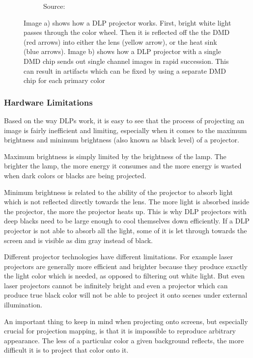 \begin{figure}[ht]
\begin{subfigure}[b]{0.49\textwidth}
        \caption{Source: \citet{ImageProjectorDLPRainbow}}
    \end{subfigure}
    \caption{Image a) shows how a DLP projector works. First, bright white light passes through the color wheel. Then it is reflected off the the DMD (red arrows) into either the lens (yellow arrow), or the heat sink (blue arrows). Image b) shows how a DLP projector with a single DMD chip sends out single channel images in rapid succession. This can result in artifacts which can be fixed by using a separate DMD chip for each primary color}
    \label{fig:background_projector_dlp}
\end{figure}

\subsubsection{Hardware Limitations}
\label{section:background-projection_mapping-projectors-limitations}

Based on the way DLPs work, it is easy to see that the process of projecting an image is fairly inefficient and limiting, especially when it comes to the maximum brightness and minimum brightness (also known as black level) of a projector.

Maximum brightness is simply limited by the brightness of the lamp. The brighter the lamp, the more energy it consumes and the more energy is wasted when dark colors or blacks are being projected.

Minimum brightness is related to the ability of the projector to absorb light which is not reflected directly towards the lens. The more light is absorbed inside the projector, the more the projector heats up. This is why DLP projectors with deep blacks need to be large enough to cool themselves down efficiently. If a DLP projector is not able to absorb all the light, some of it is let through towards the screen and is visible as dim gray instead of black.

Different projector technologies have different limitations. For example laser projectors are generally more efficient and brighter because they produce exactly the light color which is needed, as opposed to filtering out white light. But even laser projectors cannot be infinitely bright and even a projector which can produce true black color will not be able to project it onto scenes under external illumination.

An important thing to keep in mind when projecting onto screens, but especially crucial for projection mapping, is that it is impossible to reproduce arbitrary appearance. The less of a particular color a given background reflects, the more difficult it is to project that color onto it.


